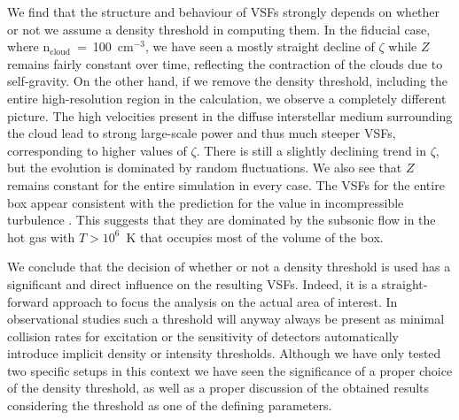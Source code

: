We find that the structure and behaviour of VSFs strongly depends on whether or not 
    we assume a density threshold in computing them.
In the 
     fiducial 
case, where n$_\mathrm{cloud}$~=~100~cm$^{-3}$, we have seen a mostly straight decline of $\zeta$ while $Z$ remains fairly constant over time, reflecting the contraction of the clouds due to self-gravity.
%
   On the other hand, if we remove the density threshold, including the entire high-resolution 
   region in the calculation,
we observe a completely different picture.
    The high velocities present in the diffuse interstellar medium surrounding the cloud 
     lead to strong large-scale power and thus much steeper VSFs, corresponding to 
     higher values of $\zeta$. 
There is still a slightly declining trend in $\zeta$, but the evolution is dominated by random fluctuations.
We also see that 
     $Z$ remains constant for the entire simulation in every case.
    The VSFs for the entire box appear consistent with the prediction for the value in incompressible turbulence \citep{Boldyrev2002}. This suggests that they are dominated by the subsonic flow in the hot gas with $T > 10^6$~K that occupies most of the volume of the box.  


We conclude that the decision of whether or not a density threshold is used 
has a significant and direct influence on the resulting VSFs.
     Indeed, 
it is a straight-forward approach to
    focus the analysis 
on the actual area of interest.
In observational studies such a threshold will anyway always be present as minimal collision rates for excitation or the sensitivity of detectors automatically introduce implicit density or intensity thresholds. 
Although we have only tested two specific setups in this context we have seen the significance of a proper choice of the density threshold, as well as a proper discussion of the obtained results considering the threshold as one of the defining parameters.

